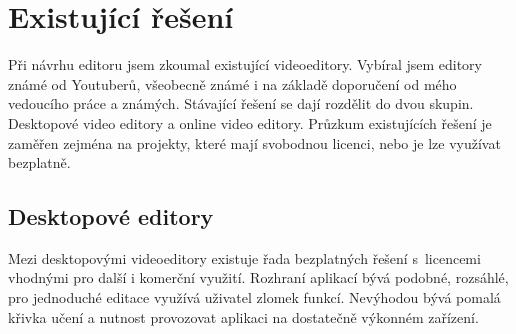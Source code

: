\chapter{Existující řešení}\label{cap:comparsion}
Při návrhu editoru jsem zkoumal existující videoeditory. Vybíral jsem editory známé od Youtuberů, všeobecně známé i na základě doporučení od mého vedoucího práce a známých. Stávající řešení se dají rozdělit do dvou skupin. Desktopové video editory a online video editory. Průzkum existujících řešení je zaměřen zejména na projekty, které mají svobodnou licenci, nebo je lze využívat bezplatně.

\section{Desktopové editory}
Mezi desktopovými videoeditory existuje řada bezplatných řešení s~licencemi vhodnými pro další i komerční využití. Rozhraní aplikací bývá podobné, rozsáhlé, pro jednoduché editace využívá uživatel zlomek funkcí. Nevýhodou bývá pomalá křivka učení a nutnost provozovat aplikaci na dostatečně výkonném zařízení.

